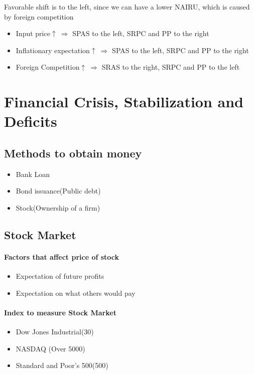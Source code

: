 \documentclass[11pt]{article}
\begin{document}
Favorable shift is to the left, since we can have a lower NAIRU, which is caused by foreign competition
\begin{itemize}
    \item Input price$\uparrow\ \Rightarrow$ SPAS to the left, SRPC and PP to the right
    \item Inflationary expectation$\uparrow\ \Rightarrow$ SPAS to the left, SRPC and PP to the right
    \item Foreign Competition$\uparrow\ \Rightarrow$ SRAS to the right, SRPC and PP to the left
\end{itemize}

\section{Financial Crisis, Stabilization and Deficits}
\subsection{Methods to obtain money}
\begin{itemize}
    \item Bank Loan
    \item Bond issuance(Public debt)
    \item Stock(Ownership of a firm)
\end{itemize}
\subsection{Stock Market}
\paragraph{Factors that affect price of stock}
\begin{itemize}
\item Expectation of future profits
\item Expectation on what others would pay
\end{itemize}
\paragraph{Index to measure Stock Market}
\begin{itemize}
    \item Dow Jones Industrial(30)
    \item NASDAQ (Over 5000)
    \item Standard and Poor’s 500(500)
\end{itemize}
\end{document}
